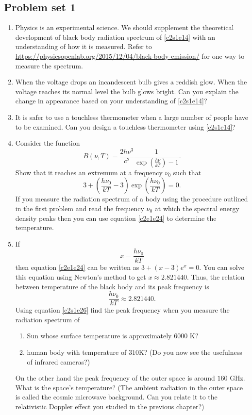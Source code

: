 \subsection{Problem set 1}
\begin{enumerate}
\item Physics is an experimental science. We should supplement the theoretical
development of black body radiation spectrum of \eqref{c2s1e14} with an 
understanding of how it is measured. Refer to 
\url{https://physicsopenlab.org/2015/12/04/black-body-emission/} for one way to
measure the spectrum.
\item When the voltage drops an incandescent bulb gives a reddish glow. When the
voltage reaches its normal level the bulb glows bright. Can you explain the 
change in appearance based on your understanding of \eqref{c2s1e14}?
\item It is safer to use a touchless thermometer when a large number of people
have to be examined. Can you design a touchless thermometer using 
\eqref{c2s1e14}?
\item Consider the function
\begin{equation}\label{c2e1e23}
B(\nu, T) = \frac{2h\nu^3}{c^2}\frac{1}{\exp\left(\frac{h\nu}{kT}\right) - 1}.
\end{equation}
Show that it reaches an extremum at a frequency $\nu_0$ such that
\begin{equation}\label{c2e1e24}
3 + \left(\frac{h\nu_0}{kT} - 3\right)\exp\left(\frac{h\nu_0}{kT}\right) = 0.
\end{equation}
If you measure the radiation spectrum of a body using the procedure outlined
in the first problem and read the frequency $\nu_0$ at which the spectral energy 
density peaks then you can use equation \eqref{c2e1e24} to determine the 
temperature.
\item If 
\begin{equation}\label{c2e1e25}
x = \frac{h\nu_0}{kT}
\end{equation}
then equation \eqref{c2e1e24} can be written as $3 + (x - 3)e^x = 0$. You can
solve this equation using Newton's method to get $x \approx 2.821440$. Thus,
the relation between temperature of the black body and its peak frequency is
\begin{equation}\label{c2s1e26}
\frac{h\nu_0}{kT} \approx 2.821440.
\end{equation}
Using equation \eqref{c2s1e26} find the peak frequency when you measure the
radiation spectrum of
\begin{enumerate}
\item Sun whose surface temperature is approximately $6000$ K?
\item human body with temperature of $310$K? (Do you now see the usefulness
of infrared cameras?)
\end{enumerate}
On the other hand the peak frequency of the outer space is around $160$ GHz.
What is the space's temperature? (The ambient radiation in the outer space 
is called the cosmic microwave background. Can you relate it to the relativistic
Doppler effect you studied in the previous chapter?)
\end{enumerate}

